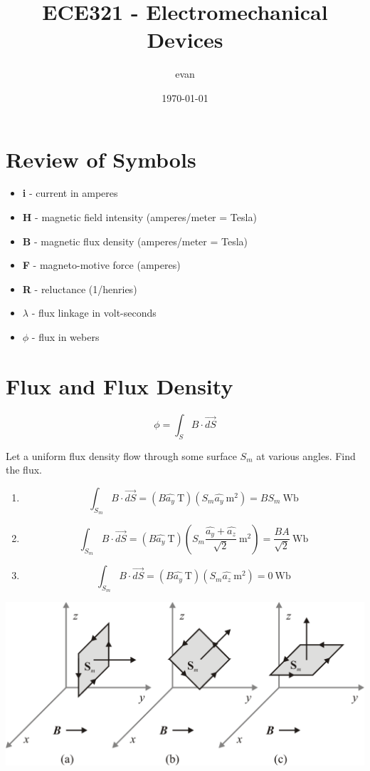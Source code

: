 \documentclass[11pt]{article}
\author{evan}
\date{\today}
\title{ECE321 - Electromechanical Devices}
\begin{document}
\maketitle
\tableofcontents


\section{Review of Symbols}
\label{sec:org1220a03}
\begin{itemize}
\item \textbf{i} - current in amperes
\item \textbf{H} - magnetic field intensity (amperes/meter = Tesla)
\item \textbf{B} - magnetic flux density (amperes/meter = Tesla)
\item \textbf{F} - magneto-motive force (amperes)
\item \textbf{R} - reluctance (1/henries)
\item \textbf{\(\lambda\)} - flux linkage in volt-seconds
\item \(\phi\) - flux in webers
\end{itemize}

\section{Flux and Flux Density}
\label{sec:org3a28413}

$$\phi = \int_S B \cdot \overrightarrow{dS}$$

\begin{examples}
Let a uniform flux density flow through some surface \(S_m\) at various angles.  Find the flux.
\begin{enumerate}
\item $$\int_{S_m} B \cdot \overrightarrow{dS} = (B \hat{a_y}\ \text{T})(S_m \hat{a_y}\ \text{m}^2) = BS_m\ \text{Wb}$$
\item $$\int_{S_m} B \cdot \overrightarrow{dS} = (B \hat{a_y}\ \text{T})(S_m \frac{\hat{a_y} + \hat{a_z}}{\sqrt{2}}\ \text{m}^2) = \frac{BA}{\sqrt{2}}\ \text{Wb}$$
\item $$\int_{S_m} B \cdot \overrightarrow{dS} = (B \hat{a_y}\ \text{T})(S_m \hat{a_z}\ \text{m}^2) = 0\ \text{Wb}$$
\end{enumerate}
\end{examples}
\begin{center}
\includegraphics[width=.9\linewidth]{./flux.png}
\end{center}
\end{document}
